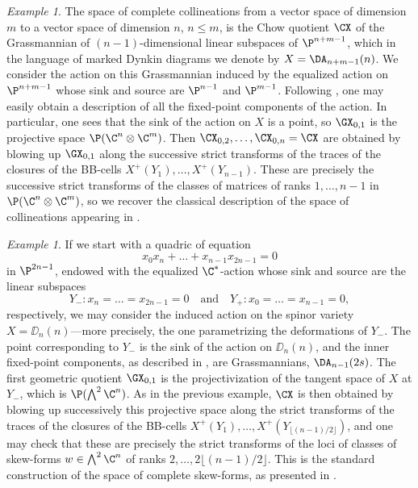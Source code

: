 \documentclass[11pt]{amsart}
\numberwithin{equation}{section}
\theoremstyle{definition}
\theoremstyle{remark}
\newtheorem{example}[theorem]{Example}
\begin{document}
\begin{example}\label{ex:classicex1}
The space of complete collineations from a vector space of dimension $m$ to a vector space of dimension $n$, $n\leq m$, is the Chow quotient $\CX$ of the Grassmannian of $(n-1)$-dimensional linear subspaces of $\P^{n+m-1}$,  which in the language of marked Dynkin diagrams we denote by $X=\DA_{n+m-1}(n)$. We consider the action on this Grassmannian induced by the equalized action on $\P^{n+m-1}$ whose sink and source are  $\P^{n-1}$ and  $\P^{m-1}$. Following \cite{WORS5,FS}, one may easily obtain a description of all the fixed-point components of the action. In particular, one sees that the sink of the action on $X$ is a point, so $\GX_{0,1}$ is the projective space $\P(\C^n\otimes\C^m)$. Then $\CX_{0,2},\dots,\CX_{0,n}=\CX$ are obtained  by blowing up $\GX_{0,1}$ along the successive strict transforms of the traces of the closures of the BB-cells $X^+(Y_1), \dots, X^+(Y_{n-1})$. These are precisely the successive strict transforms of the classes of matrices of ranks $1,\dots,n-1$ in $\P(\C^n\otimes\C^m)$,  so we recover the classical description of the space of collineations appearing in \cite{Vai84}.
\end{example}

\begin{example}\label{ex:classicex2}
  If we start with a quadric of equation \[x_0x_{n}+\dots+x_{n-1}x_{2n-1}=0\] in $\P^{2n-1}$, endowed with the equalized $\C^*$-action whose sink and source are the linear subspaces
  \[Y_-:x_n=\dots=x_{2n-1}=0\quad\mbox{and}\quad Y_+:x_0=\dots=x_{n-1}=0,\]
respectively, we may consider the induced action on the spinor variety $X=\DD_n(n)$---more precisely,  the one parametrizing the deformations of $Y_-$. The point corresponding to $Y_-$ is the sink of the action on $\DD_n(n)$, and the inner fixed-point components, as described in \cite{FS}, are Grassmannians, $\DA_{n-1}(2s)$. The first geometric quotient $\GX_{0,1}$ is the projectivization of the tangent space of $X$ at $Y_-$, which is $\P(\bigwedge^2\C^n)$. As in the previous example, $\CX$ is then obtained by blowing up successively  this projective space along the  strict transforms of the traces of the closures of the BB-cells $X^+(Y_1), \dots, X^+(Y_{\lfloor(n-1)/2\rfloor})$, and one may check that these are precisely the strict transforms of the loci of classes of skew-forms $w\in \bigwedge^2\C^n$ of ranks $2,\dots, 2\lfloor(n-1)/2\rfloor$. This is the standard construction of the space of complete skew-forms, as presented in \cite{Thaddeus}.
\end{example}
\end{document}
